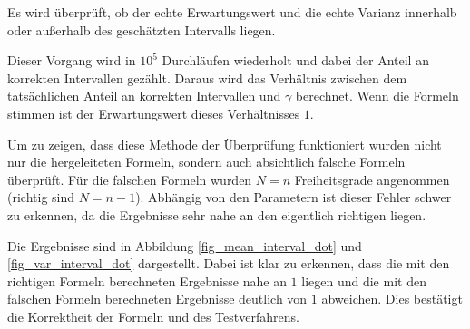 \documentclass[10pt,twocolumn]{scrartcl}
\begin{document}
		Es wird überprüft, ob der echte Erwartungswert und die echte Varianz innerhalb oder außerhalb des geschätzten Intervalls liegen.

		Dieser Vorgang wird in $10^5$ Durchläufen wiederholt und dabei der Anteil an korrekten Intervallen gezählt. Daraus wird das Verhältnis zwischen dem tatsächlichen Anteil an korrekten Intervallen und $\gamma$ berechnet. Wenn die Formeln stimmen ist der Erwartungswert dieses Verhältnisses $1$.

		Um zu zeigen, dass diese Methode der Überprüfung funktioniert wurden nicht nur die hergeleiteten Formeln, sondern auch absichtlich falsche Formeln überprüft. Für die falschen Formeln wurden $N = n$ Freiheitsgrade angenommen (richtig sind $N = n-1$). Abhängig von den Parametern ist dieser Fehler schwer zu erkennen, da die Ergebnisse sehr nahe an den eigentlich richtigen liegen.

		Die Ergebnisse sind in Abbildung \ref{fig_mean_interval_dot} und \ref{fig_var_interval_dot} dargestellt. Dabei ist klar zu erkennen, dass die mit den richtigen Formeln berechneten Ergebnisse nahe an $1$ liegen und die mit den falschen Formeln berechneten Ergebnisse deutlich von $1$ abweichen. Dies bestätigt die Korrektheit der Formeln und des Testverfahrens.
\end{document}
